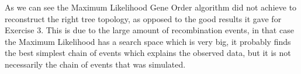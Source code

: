 \documentclass[]{article}
\theoremstyle{definition}
\begin{document}
As we can see the Maximum Likelihood Gene Order algorithm did not achieve to reconstruct the right tree topology, as opposed to the good results it gave for Exercise 3. This is due to the large amount of recombination events, in that case the Maximum Likelihood has a search space which is very big, it probably finds the best simplest chain of events which explains the observed data, but it is not necessarily the chain of events that was simulated. \\
\end{document}
